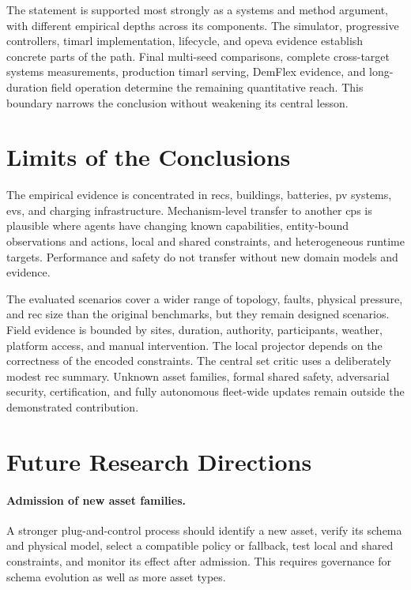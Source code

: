 The statement is supported most strongly as a systems and method argument, with different empirical depths across its components. The simulator, progressive controllers, \gls{timarl} implementation, lifecycle, and \gls{opeva} evidence establish concrete parts of the path. Final multi-seed comparisons, complete cross-target systems measurements, production \gls{timarl} serving, DemFlex evidence, and long-duration field operation determine the remaining quantitative reach. This boundary narrows the conclusion without weakening its central lesson.

\section{Limits of the Conclusions}
\label{sec:conclusion-limits}

The empirical evidence is concentrated in \glspl{rec}, buildings, batteries, \gls{pv} systems, \glspl{ev}, and charging infrastructure. Mechanism-level transfer to another \gls{cps} is plausible where agents have changing known capabilities, entity-bound observations and actions, local and shared constraints, and heterogeneous runtime targets. Performance and safety do not transfer without new domain models and evidence.

The evaluated scenarios cover a wider range of topology, faults, physical pressure, and \gls{rec} size than the original benchmarks, but they remain designed scenarios. Field evidence is bounded by sites, duration, authority, participants, weather, platform access, and manual intervention. The local projector depends on the correctness of the encoded constraints. The central set critic uses a deliberately modest \gls{rec} summary. Unknown asset families, formal shared safety, adversarial security, certification, and fully autonomous fleet-wide updates remain outside the demonstrated contribution.

\section{Future Research Directions}
\label{sec:conclusion-future}

\paragraph{Admission of new asset families.}
A stronger plug-and-control process should identify a new asset, verify its schema and physical model, select a compatible policy or fallback, test local and shared constraints, and monitor its effect after admission. This requires governance for schema evolution as well as more asset types.

